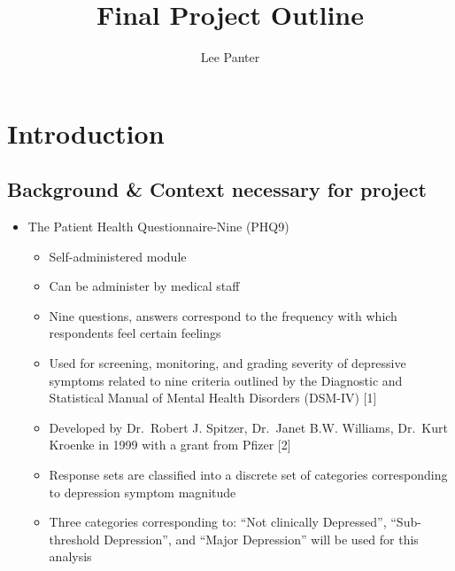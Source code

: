 \documentclass[12pt,]{article}
\title{\vspace{3in} Final Project Outline}
\author{Lee Panter}
\date{}
\providecommand{\tightlist}{%
  \setlength{\itemsep}{0pt}\setlength{\parskip}{0pt}}
\begin{document}
\maketitle

\newpage

\setcounter{secnumdepth}{4}
\setcounter{tocdepth}{4}
\tableofcontents

\newpage

\hypertarget{introduction}{%
\section{Introduction}\label{introduction}}

\hypertarget{background-context-necessary-for-project}{%
\subsection{Background \& Context necessary for
project}\label{background-context-necessary-for-project}}

\begin{itemize}
\tightlist
\item
  The Patient Health Questionnaire-Nine (PHQ9)

  \begin{itemize}
  \tightlist
  \item
    Self-administered module
  \item
    Can be administer by medical staff
  \item
    Nine questions, answers correspond to the frequency with which
    respondents feel certain feelings
  \item
    Used for screening, monitoring, and grading severity of depressive
    symptoms related to nine criteria outlined by the Diagnostic and
    Statistical Manual of Mental Health Disorders (DSM-IV) {[}1{]}
  \item
    Developed by Dr.~Robert J. Spitzer, Dr.~Janet B.W. Williams,
    Dr.~Kurt Kroenke in 1999 with a grant from Pfizer {[}2{]}
  \item
    Response sets are classified into a discrete set of categories
    corresponding to depression symptom magnitude
  \item
    Three categories corresponding to: ``Not clinically Depressed'',
    ``Sub-threshold Depression'', and ``Major Depression'' will be used
    for this analysis
  \end{itemize}
\end{itemize}
\end{document}
